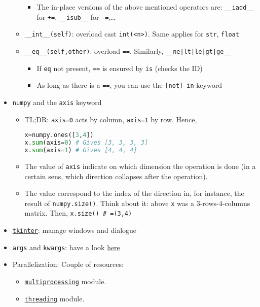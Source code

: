 \documentclass[a4paper,12pt,%
              final%
              ]{article}
\begin{document}
\begin{itemize}
\begin{itemize}
\begin{itemize}
          \item The in-place versions of the above mentioned operators are: \verb|__iadd__| for \verb|+=|, \verb|__isub__| for \verb|-=|,\ldots
        \end{itemize}
      \item \verb|__int__(self)|: overload cast \verb|int(<n>)|. Same applies for \verb|str|, \verb|float|
      \item \verb|__eq__(self,other)|: overload \verb|==|. Similarly, \verb!__ne|lt|le|gt|ge__!
        \begin{itemize}
          \item If \texttt{eq} not present, \texttt{==} is ensured by \texttt{is} (checks the ID)
          \item As long as there is a \texttt{==}, you can use the \verb|[not] in| keyword
        \end{itemize}
    \end{itemize}
  \item \texttt{numpy} and the \texttt{axis} keyword
    \begin{itemize}
      \item TL;DR: \verb|axis=0| acts by column, \verb|axis=1| by row. Hence,
\begin{lstlisting}[language=python]
x=numpy.ones([3,4])
x.sum(axis=0) # Gives [3, 3, 3, 3]
x.sum(axis=1) # Gives [4, 4, 4]
\end{lstlisting}
      \item The value of \texttt{axis} indicate on which dimension the operation is done (in a certain sens, which direction collapses after the operation).
      \item The value correspond to the index of the direction in, for instance, the result of \verb|numpy.size()|. Think about it: above \verb|x| was a 3-rows-4-columns matrix. Then, \verb|x.size() # =(3,4)|
    \end{itemize}
  \item \href{https://docs.python.org/3/library/tkinter.html}{\texttt{tkinter}}: manage windows and dialogue
  \item \texttt{args} and \texttt{kwargs}: have a look \href{https://realpython.com/python-kwargs-and-args/}{here}
  \item Parallelization: Couple of resources:
    \begin{itemize}
      \item \href{https://docs.python.org/3/library/multiprocessing.html}{\texttt{multiprocessing}} module.
      \item \href{https://docs.python.org/3/library/threading.html}{\texttt{threading}} module.

\end{itemize}
\end{itemize}
\end{document}
